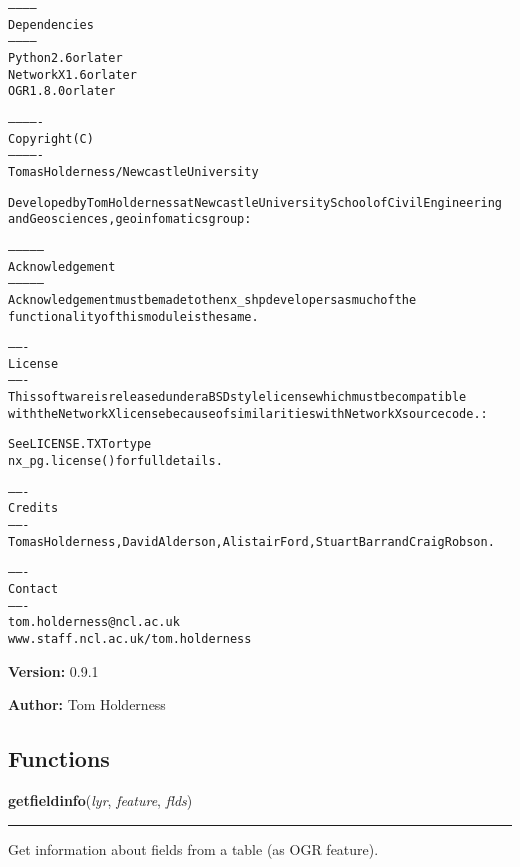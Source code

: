 \begin{alltt}
------------
Dependencies
------------
Python 2.6 or later
NetworkX 1.6 or later
OGR 1.8.0 or later

-------------
Copyright (C)
-------------
Tomas Holderness / Newcastle University

Developed by Tom Holderness at Newcastle University School of Civil Engineering
and Geosciences, geoinfomatics group:

---------------
Acknowledgement 
---------------
Acknowledgement must be made to the nx\_shp developers as much of the 
functionality of this module is the same.

-------
License
-------
This software is released under a BSD style license which must be compatible
with the NetworkX license because of similarities with NetworkX source code.:
    
See LICENSE.TXT or type
nx\_pg.license() for full details.

-------
Credits
-------
Tomas Holderness, David Alderson, Alistair Ford, Stuart Barr and Craig Robson.

-------
Contact
-------
tom.holderness@ncl.ac.uk
www.staff.ncl.ac.uk/tom.holderness
\end{alltt}

\textbf{Version:} 0.9.1



\textbf{Author:} Tom Holderness





  \subsection{Functions}

    \label{nx_pg:getfieldinfo}

    \vspace{0.5ex}

\hspace{.8\funcindent}\begin{boxedminipage}{\funcwidth}

    \raggedright \textbf{getfieldinfo}(\textit{lyr}, \textit{feature}, \textit{flds})

    \vspace{-1.5ex}

    \rule{\textwidth}{0.5\fboxrule}
\setlength{\parskip}{2ex}
    Get information about fields from a table (as OGR feature).

\setlength{\parskip}{1ex}
    \end{boxedminipage}

